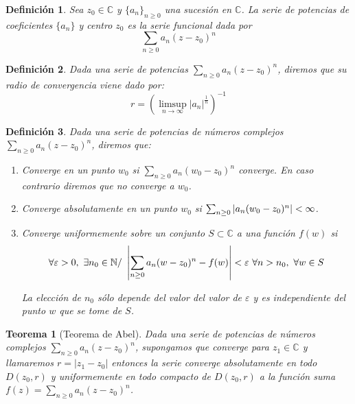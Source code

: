 \documentclass[10pt]{book}
\newtheorem{defi}{Definición}[chapter]
\newtheorem{theorem}{Teorema}[chapter]
\newcommand{\C}{\mathbb{C}}
\newcommand{\N}{\mathbb{N}}
\begin{document}
\begin{defi}
Sea $z_0\in \C$ y $\{a_n\}_{n\geq 0}$ una sucesión en $\C$. La serie de potencias de coeficientes $\{a_n\}$ y centro $z_0$ es la serie funcional dada por
$$
\sum_{n\geq 0} a_n(z-z_0)^n
$$ 
\end{defi}

\begin{defi}
Dada una serie de potencias $\sum_{n\geq 0} a_n(z-z_0)^n$, diremos que su radio de convergencia viene dado por:
$$
r = \left(\limsup_{n\to \infty} |a_n|^{\frac{1}{n}}\right)^{-1}
$$
\end{defi}

\begin{defi}
Dada una serie de potencias de números complejos $\sum_{n\geq 0} a_n(z-z_0)^n$, diremos que:
\begin{enumerate}
\item Converge en un punto $w_0$ si $\sum_{n\geq 0} a_n(w_0-z_0)^n$ converge. En caso contrario diremos que no converge a $w_0$.
\item Converge absolutamente en un punto $w_0$ si $\sum_{n\geq 0} \left| a_n(w_0-z_0)^n\right|<\infty$.
\item Converge uniformemente sobre un conjunto $S \subset \C$ a una función $f(w)$ si 
$$
\forall\varepsilon>0,\ \exists n_0\in\N /\ \abs{\sum_{n\geq 0} a_n(w-z_0)^n-f(w)}<\varepsilon \ \forall n> n_0,\ \forall w\in S
$$

La elección de $n_0$ sólo depende del valor del valor de $\varepsilon$ y es independiente del punto $w$ que se tome de $S$.
\end{enumerate}
\end{defi}


\begin{theorem}[Teorema de Abel]
Dada una serie de potencias de números complejos  $\sum_{n\geq 0} a_n(z-z_0)^n$, supongamos que converge para $z_1\in\C$ y llamaremos $r = |z_1-z_0|$ entonces la serie converge absolutamente en todo $D(z_0,r)$ y uniformemente en todo compacto de $D(z_0,r)$ a la función suma $f(z) =  \sum_{n\geq 0} a_n(z-z_0)^n$.
\end{theorem}
\end{document}
